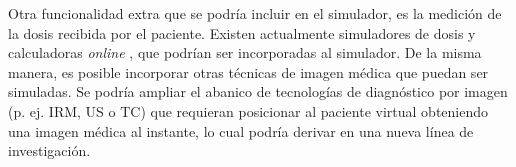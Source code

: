 Otra funcionalidad extra que se podría incluir en el simulador, es la medición de la dosis recibida por el paciente. Existen actualmente simuladores de dosis y calculadoras \emph{online} \cite{xraydose}, que podrían ser incorporadas al simulador. De la misma manera, es posible incorporar otras técnicas de imagen médica que puedan ser simuladas. Se podría ampliar el abanico de tecnologías de diagnóstico por imagen (p. ej. \acs{IRM}, \acs{US} o \acs{TC}) que requieran posicionar al paciente virtual obteniendo una imagen médica al instante, lo cual podría derivar en una nueva línea de investigación.











